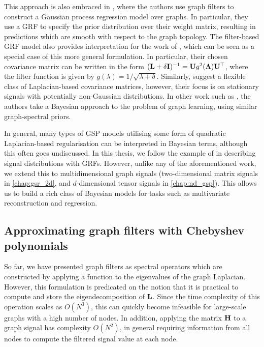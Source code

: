 This approach is also embraced in \cite{Venkitaraman2020}, where the authors use graph filters to construct a Gaussian process regression model over graphs. In particular, they use a GRF to specify the prior distribution over their weight matrix, resulting in predictions which are smooth with respect to the graph topology. The filter-based GRF model also provides interpretation for the work of \cite{Gadde2015}, which can be seen as a special case of this more general formulation. In particular, their chosen covariance matrix can be written in the form $(\mathbf{L} + \delta \mathbf{I})^{-1} = \mathbf{U} g^2(\mathbf{\Lambda}) \mathbf{U}^\top$, where the filter function is given by $g(\lambda) = 1 / \sqrt{\lambda + \delta}$. Similarly, \citep{Perraudin2017} suggest a flexible class of Laplacian-based covariance matrices, however, their focus is on stationary signals with potentially non-Gaussian distributions. In other work such as \cite{Dong2016}, the authors take a Bayesian approach to the problem of graph learning, using similar graph-spectral priors. 

In general, many types of GSP models utilising some form of quadratic Laplacian-based regularisation can be interpreted in Bayesian terms, although this often goes undiscussed. In this thesis, we follow the example of \cite{Zhang2015} in describing signal distributions with GRFs. However, unlike any of the aforementioned work, we extend this to multidimensional graph signals (two-dimensional matrix signals in \cref{chap:gsr_2d}, and $d$-dimensional tensor signals in \cref{chap:nd_gsp}). This allows us to build a rich class of Bayesian models for tasks such as multivariate reconstruction and regression. 

\subsection{Approximating graph filters with Chebyshev polynomials}

\label{sec:Chebyshev}

So far, we have presented graph filters as spectral operators which are constructed by applying a function to the eigenvalues of the graph Laplacian. However, this formulation is predicated on the notion that it is practical to compute and store the eigendecomposition of $\mathbf{L}$. Since the time complexity of this operation scales as $O(N^3)$, this can quickly become infeasible for large-scale graphs with a high number of nodes. In addition, applying the matrix $\mathbf{H}$ to a graph signal has complexity $O(N^2)$, in general requiring information from all nodes to compute the filtered signal value at each node. 

